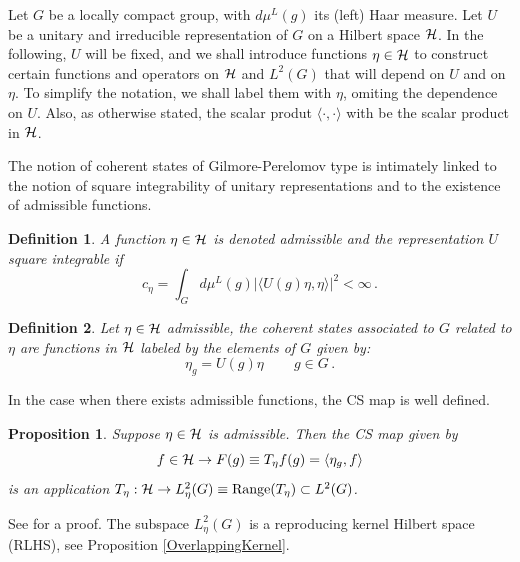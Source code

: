\documentclass[11pt]{article}
\newtheorem{definition}{Definition}[section]
\newtheorem{proposition}{Proposition}[section]
\begin{document}
 Let $G$ be a locally compact group, with $d\mu^L(g)$ its (left) Haar measure.  Let $U$ be a unitary and irreducible representation of $G$ on a Hilbert space $\cal H$. In the following,  $U$ will be fixed, and we shall introduce functions $\eta\in\cal H$ to construct certain functions and operators on $\cal H$ and $L^2(G)$ that will depend on $U$ and on $\eta$. To simplify the notation, we shall label them with $\eta$, omiting the dependence on $U$. Also, as otherwise stated, the scalar produt $\langle\cdot,\cdot\rangle$ with be the scalar product in ${\cal H}$.
 
 The notion of coherent states of Gilmore-Perelomov type is intimately linked to the notion of square integrability of unitary representations and to the existence of admissible functions.
 
 
 
 \begin{definition}
 A function $\eta\in\cal H$ is denoted admissible and the representation $U$ square integrable if
 \begin{equation}
  c_\eta=\int_{G}d\mu^L(g) |\langle U(g)\eta,\eta\rangle|^2<\infty \,.
 \end{equation}
\end{definition}



\begin{definition}
Let $ \eta\in {\cal H}$ admissible, the coherent states associated to $G$ related to $ \eta$ are functions in ${\cal H}$ labeled by the elements of $G$  given by:
\begin{equation}
\eta_{g}=  U(g) \eta\,\qquad g\in G\,.
\end{equation}
\label{defCS}
\end{definition}


In the case when there exists admissible functions, the CS map is well defined.
\begin{proposition} \label{CSmap}
Suppose $\eta\in {\cal H}$ is admissible. Then the CS map given by
 \begin{equation}
  f\in{\cal H}\rightarrow F(g)\equiv T_\eta f(g)= \langle \eta_{g},f\rangle  
 \end{equation}
 is an application $T_\eta:{\cal H}\rightarrow L_\eta^2(G)\equiv  {\rm Range}(T_\eta)  \subset  L^2(G)$.

\end{proposition}

See \cite{Grossmann85} for a proof. The subspace  $L_\eta^2(G)$ is a reproducing kernel Hilbert space (RLHS), see Proposition \ref{OverlappingKernel}.
\end{document}
